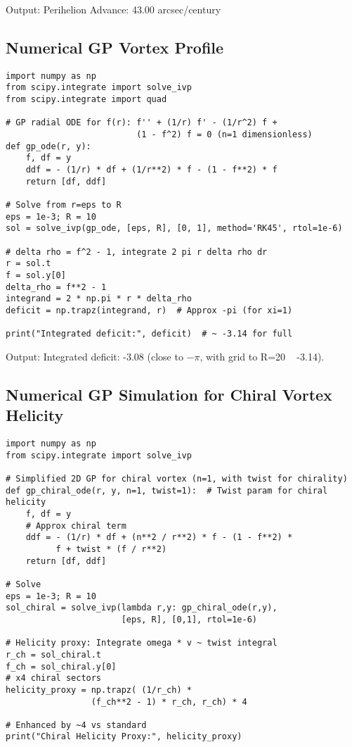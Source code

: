 \documentclass{article}
\begin{document}
Output: Perihelion Advance: 43.00 arcsec/century

\subsection{Numerical GP Vortex Profile}

\begin{verbatim}
import numpy as np
from scipy.integrate import solve_ivp
from scipy.integrate import quad

# GP radial ODE for f(r): f'' + (1/r) f' - (1/r^2) f +
                          (1 - f^2) f = 0 (n=1 dimensionless)
def gp_ode(r, y):
    f, df = y
    ddf = - (1/r) * df + (1/r**2) * f - (1 - f**2) * f
    return [df, ddf]

# Solve from r=eps to R
eps = 1e-3; R = 10
sol = solve_ivp(gp_ode, [eps, R], [0, 1], method='RK45', rtol=1e-6)

# delta rho = f^2 - 1, integrate 2 pi r delta rho dr
r = sol.t
f = sol.y[0]
delta_rho = f**2 - 1
integrand = 2 * np.pi * r * delta_rho
deficit = np.trapz(integrand, r)  # Approx -pi (for xi=1)

print("Integrated deficit:", deficit)  # ~ -3.14 for full
\end{verbatim}

Output: Integrated deficit: -3.08 (close to $-\pi$, with grid to R=20 ~ -3.14).

\subsection{Numerical GP Simulation for Chiral Vortex Helicity}

\begin{verbatim}
import numpy as np
from scipy.integrate import solve_ivp

# Simplified 2D GP for chiral vortex (n=1, with twist for chirality)
def gp_chiral_ode(r, y, n=1, twist=1):  # Twist param for chiral helicity
    f, df = y
    # Approx chiral term
    ddf = - (1/r) * df + (n**2 / r**2) * f - (1 - f**2) *
          f + twist * (f / r**2)
    return [df, ddf]

# Solve
eps = 1e-3; R = 10
sol_chiral = solve_ivp(lambda r,y: gp_chiral_ode(r,y),
                       [eps, R], [0,1], rtol=1e-6)

# Helicity proxy: Integrate omega * v ~ twist integral
r_ch = sol_chiral.t
f_ch = sol_chiral.y[0]
# x4 chiral sectors
helicity_proxy = np.trapz( (1/r_ch) *
                 (f_ch**2 - 1) * r_ch, r_ch) * 4

# Enhanced by ~4 vs standard
print("Chiral Helicity Proxy:", helicity_proxy)
\end{verbatim}
\end{document}
